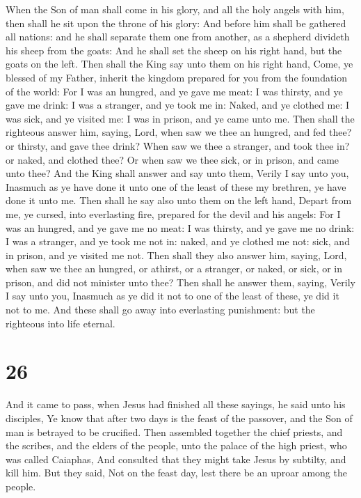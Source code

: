  When the Son of man shall come in his glory, and all the
holy angels with him, then shall he sit upon the throne of his glory:
 And before him shall be gathered all nations: and he
shall separate them one from another, as a shepherd divideth his sheep
from the goats:  And he shall set the sheep on his right
hand, but the goats on the left.  Then shall the King say
unto them on his right hand, Come, ye blessed of my Father, inherit the
kingdom prepared for you from the foundation of the world:
 For I was an hungred, and ye gave me meat: I was
thirsty, and ye gave me drink: I was a stranger, and ye took me in:
 Naked, and ye clothed me: I was sick, and ye visited me:
I was in prison, and ye came unto me.  Then shall the
righteous answer him, saying, Lord, when saw we thee an hungred, and fed
thee? or thirsty, and gave thee drink?  When saw we thee
a stranger, and took thee in? or naked, and clothed thee?
 Or when saw we thee sick, or in prison, and came unto
thee?  And the King shall answer and say unto them,
Verily I say unto you, Inasmuch as ye have done it unto one of the least
of these my brethren, ye have done it unto me.  Then
shall he say also unto them on the left hand, Depart from me, ye cursed,
into everlasting fire, prepared for the devil and his angels:
 For I was an hungred, and ye gave me no meat: I was
thirsty, and ye gave me no drink:  I was a stranger, and
ye took me not in: naked, and ye clothed me not: sick, and in prison,
and ye visited me not.  Then shall they also answer him,
saying, Lord, when saw we thee an hungred, or athirst, or a stranger, or
naked, or sick, or in prison, and did not minister unto thee?
 Then shall he answer them, saying, Verily I say unto
you, Inasmuch as ye did it not to one of the least of these, ye did it
not to me.  And these shall go away into everlasting
punishment: but the righteous into life eternal.

\hypertarget{section-25}{%
\section{26}\label{section-25}}

 And it came to pass, when Jesus had finished all these
sayings, he said unto his disciples,  Ye know that after
two days is the feast of the passover, and the Son of man is betrayed to
be crucified.  Then assembled together the chief priests,
and the scribes, and the elders of the people, unto the palace of the
high priest, who was called Caiaphas,  And consulted that
they might take Jesus by subtilty, and kill him.  But they
said, Not on the feast day, lest there be an uproar among the people.

